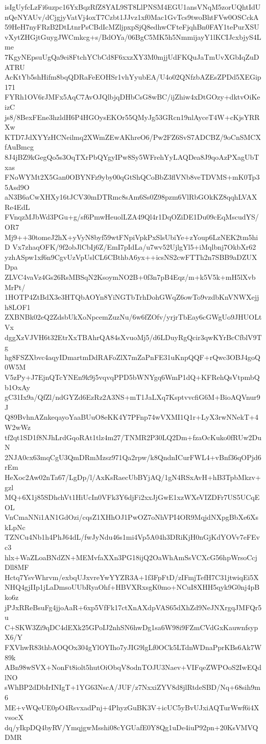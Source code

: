 isIgUyfcLzFi6uzpc16YxBqzRfZ8YAL9ST8LlPNSM4EGU1ansVNqM5zorUQhtIdU
nQeNYAUv/dCjgjyVatVj4oxT7Czbt1JJvz1xf0Mac1GvTcs9twoBhtFVw0OSCckA
59HeH7nyFRzB2DtLtnrPsCBdIcMZljpxpSjQ8edhwCFteFjqhBn0FAY1tePurXSU
vXytZHGjtGuygJWCmkcg+s/BdOYa/06BgC5MK5h5NmmijayY1lKCIJcxbjyS4Lme
7KgyNEpsuUgQa9ei8FtchYCbCd8F6xxzXY3M0mjjUdFKQuJaTmUvXGbIqZuDATRU
AcKtYb5shHifm8bqQDRaFeEOHSr1vhYyubEA/U4o02QNfzbAZEsZPDd5XEGip171
FYRh1OV6rJMFx5AqC7AvOJQlbjqDHbCsG8wBC/ijZhiw4xDtGOzy+dktvOiKeizC
js8/8BexFEne3hzldH6P4HGOysEKOr55QMyJg53GRcn19nlAyceT4W+cKjsYRRXw
KTD7JdXYYzHCNeilmq2XWmZEwAKhreO6/Pw2FZ6SvS7ADCBZ/9oCnSMCXfAuBmcg
8J4jBZ9kGegQo5s3OqTXrPbQYgyIPw8Sy5WFrehYyLAQDea8J9qoAzPXagUbTxas
FNoWYMt2X5Gan0OBYNFz9yby00qGtShQCoBbZ3flVNb8veTDVMS+mK0Tp35Asd9O
aN3B6aCwXHXy16tJCV30mDTRmc8sAm6Ss0Z98pzm6VlRbGOkKZ8qqhLVAXRe4EdL
FVnqzMJbWd3PGu+g/sf6PmwHeuolLZA49Ql4r1DqOZiDE1Du09cEqMscudYS/OR7
Mj9++30tomeJ2hX+yVyN8byf59wtFNpiVpkPxSlsUbiYe+zYoup6LzNEK2tm5hiD
Vx7zhaqOFK/9f2obJlCbIj6Z/EmI7pIdLa/u7wv52UjlgYl5+iMqlbnj7OkbXr62
yzhASpw1xf6n9CgvUzVpUslCL6CBthbA6yx++icsNS2cwFTTh2n7SBB9aDZUXDpa
ZLVC4vaVz4Gs26RsMBSqN2KsoymNO2B+0f3n7pB4Eqz/m+k5V5k+mH5lXvbMrPt/
1HOTP4ZtBdX3e3HTQbAOYn8YiNGTbTrhDohGWqZ6owTo9vzdbKnVNWXejjh8LOF1
ZXBNBk02eQ2ZdsbUkXoNpcemZuzNu/6w6fZOfv/yrjrTbEay6cGWgUo9JHUOLtVx
dggXzVJVH6t32EtrXxTBAhrQA84sXvuoMj5/d6LDuyRgQcir3qwKYrBcCfblV9Tg
hg8FSZXbvc4aqyIDmartmDdRAFoZlX7mZaPnFE31uKnpQQF+rQwc3OBJ4goQ0W5M
V5zPy+J7EjnQTcYNEn9k9j5vqvqPPD5bWNYgq6WmP1dQ+KFRehQsVtpmbQb1OxAy
gC31Ix9a/QfZl/ndGYZd6EzRz2A3NS+mT1JaLXq7KsptvvcfiG6M+BioAQVnur9J
Q89BvhnAZnkeqayoYaaBUuO8eKK4Y7PFnp74wVXMI1Q1r+LyX3rwNNekT+4W2wWz
tf2qt1SD1f8NJhLrdGqoRAt1tlz4m27/TNMR2P30LQ2Dm+fzaOcKuko0fRUw2DuN
2NJA0cx63mqCgU3QmDRmMzsz971Qa2rpw/k8QndnICurFWL4+vBnf36qOPjd6rEm
HeXoc2Aw02nTa67/LgDp/l/AxKsRaecUbBYjAQ/1gN4RSxAvH+hB3TpbMkzv+gzl
MQ+6X1j85SDhchVt1HiUcIn0VFk3Y6djFi2xxJjGwE1xzWXeVIZDFr7US5UCqEOL
VnCmaNNi1AN1GdOzi/cqsZ1XHhOJ1PwOZ7oNhVPI4OR9MqjdNXpgBbXe6XskLpNc
TZNCu4Nb1h4PhJ64dL/fwJyNdu46s1mi4Vp5A04h3DRiKjH0nGjKdYOVv7eFEvc3
hlx+WaZLoaBNdZN+MEMvfaXXn3PG18ijQ2OaWhAmSsVCXcG56hpWrsoCcjDll8MF
Hctq7YsvWhrvm/exbqUJxvreYwYYZR3A+1f3FpFtD/zIFmjTefH7C31jtwiqEi5X
NHQ4gjIIp1jLaDmsoUUbRyaOhf+HBVXRxsgK0mo+NCuI8XHH5qyk9G0nj4pBko6z
jPJxRReBsuFg4jjoAaR+6xp5VfFk17ctXnAXdpVAS65dXhZd9NeJNXrgqJMFQr5u
C+SKW3Zi9qDC4dEXk25GPoIJ2nhSN6hwDg1sa6W98i9FZmCVdGxKauwnfsypX6/Y
FXVhwR83thbAOQOx304gYlOYIho7yJIG9lgLf0OCk5LTdnWDnaPprKBs6Ak7W89k
ABn98wSVX+NonFt8iolt5hutOiObqV8odnTOJU3Naev+VIFqeZWPOoS2IwEQdlNO
sWhBP2dDbIrINIgT+1YG63NscA/JUF/z7NxxiZYV8d8jlRtdeSBD/Nq+68sih9m6
ME+vWQeUE0pO4RsvxadPnj+4PhyzGuBK3V+icUC5yBvUJxiAQTurWwf6i4XvsocX
dq/yIkpDQ4byRV/YmqjgwMsshi08cYGUafE0Y8Qg1uDe4iuP92pn+20KsVMVQDMR

